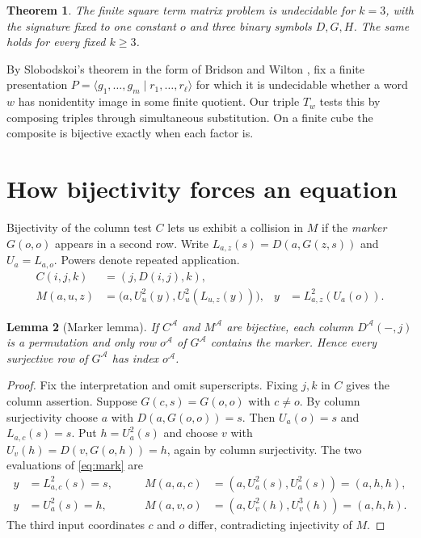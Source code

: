 \documentclass[a4paper,11pt]{article}
\newtheorem{theorem}{Theorem}
\newtheorem{lemma}[theorem]{Lemma}
\newcommand{\A}{\mathcal A}
\begin{document}
\begin{theorem}\label{thm:main}
The finite square term matrix problem is undecidable for \(k=3\), with the signature fixed to one constant \(o\) and three binary symbols \(D,G,H\). The same holds for every fixed \(k\ge3\).
\end{theorem}

By Slobodskoi's theorem in the form of Bridson and Wilton \cite[Theorem~2.1]{BW}, fix a finite presentation \(P=\langle g_1,\ldots,g_m\mid r_1,\ldots,r_\ell\rangle\) for which it is undecidable whether a word \(w\) has nonidentity image in some finite quotient. Our triple \(T_w\) tests this by composing triples through simultaneous substitution. On a finite cube the composite is bijective exactly when each factor is.

\section{How bijectivity forces an equation}
Bijectivity of the column test \(C\) lets us exhibit a collision in \(M\) if the \emph{marker} \(G(o,o)\) appears in a second row. Write \(L_{a,z}(s)=D(a,G(z,s))\) and \(U_a=L_{a,o}\). Powers denote repeated application.
\begin{align}
 C(i,j,k)&=(j,D(i,j),k),\label{eq:col}\\
 M(a,u,z)&=\bigl(a,U_u^2(y),U_u^2(L_{u,z}(y))\bigr),
       &y&=L_{a,z}^2(U_a(o)).\label{eq:mark}
\end{align}

\begin{lemma}[Marker lemma]\label{lem:marker}
If \(C^\A\) and \(M^\A\) are bijective, each column \(D^\A(-,j)\) is a permutation and only row \(o^\A\) of \(G^\A\) contains the marker. Hence every surjective row of \(G^\A\) has index \(o^\A\).
\end{lemma}
\begin{proof}
Fix the interpretation and omit superscripts. Fixing \(j,k\) in \(C\) gives the column assertion. Suppose \(G(c,s)=G(o,o)\) with \(c\ne o\). By column surjectivity choose \(a\) with \(D(a,G(o,o))=s\). Then \(U_a(o)=s\) and \(L_{a,c}(s)=s\). Put \(h=U_a^2(s)\) and choose \(v\) with \(U_v(h)=D(v,G(o,h))=h\), again by column surjectivity. The two evaluations of \eqref{eq:mark} are
\[
\begin{alignedat}{2}
 y&=L_{a,c}^2(s)=s,\qquad &M(a,a,c)&=(a,U_a^2(s),U_a^2(s))=(a,h,h),\\
 y&=U_a^2(s)=h, &M(a,v,o)&=(a,U_v^2(h),U_v^3(h))=(a,h,h).
\end{alignedat}
\]
The third input coordinates \(c\) and \(o\) differ, contradicting injectivity of \(M\).
\end{proof}
\end{document}
